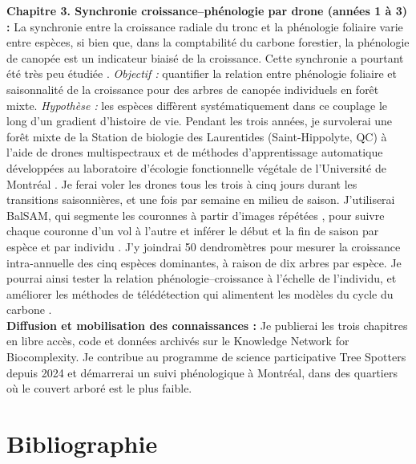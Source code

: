 \documentclass[12pt]{article}
\begin{document}
\textbf{Chapitre 3. Synchronie croissance--phénologie par drone (années 1 à 3) :}
La synchronie entre la croissance radiale du tronc et la phénologie foliaire varie entre espèces, si bien que, dans la comptabilité du carbone forestier, la phénologie de canopée est un indicateur biaisé de la croissance. Cette synchronie a pourtant été très peu étudiée \cite{klein_coordination_2016}. \textit{Objectif :} quantifier la relation entre phénologie foliaire et saisonnalité de la croissance pour des arbres de canopée individuels en forêt mixte. \textit{Hypothèse :} les espèces diffèrent systématiquement dans ce couplage le long d'un gradient d'histoire de vie. Pendant les trois années, je survolerai une forêt mixte de la Station de biologie des Laurentides (Saint-Hippolyte, QC) à l'aide de drones multispectraux et de méthodes d'apprentissage automatique \cite{ball_accurate_2023} développées au laboratoire d'écologie fonctionnelle végétale de l'Université de Montréal \cite{cloutier_influence_2024}. Je ferai voler les drones tous les trois à cinq jours durant les transitions saisonnières, et une fois par semaine en milieu de saison. J'utiliserai BalSAM, qui segmente les couronnes à partir d'images répétées \cite{teng_bringing_2025}, pour suivre chaque couronne d'un vol à l'autre et inférer le début et la fin de saison par espèce et par individu \cite{fawcett_monitoring_2021}. J'y joindrai 50 dendromètres pour mesurer la croissance intra-annuelle des cinq espèces dominantes, à raison de dix arbres par espèce. Je pourrai ainsi tester la relation phénologie--croissance à l'échelle de l'individu, et améliorer les méthodes de télédétection qui alimentent les modèles du cycle du carbone \cite{richardson_climate_2013}. \\


\textbf{Diffusion et mobilisation des connaissances :}
Je publierai les trois chapitres en libre accès, code et données archivés sur le Knowledge Network for Biocomplexity. Je contribue au programme de science participative Tree Spotters depuis 2024 et démarrerai un suivi phénologique à Montréal, dans des quartiers où le couvert arboré est le plus faible.
\newpage

\renewcommand{\refname}{}
\vspace{-1.5em}
\section*{Bibliographie}
\vspace{-2.5em}


\end{document}
